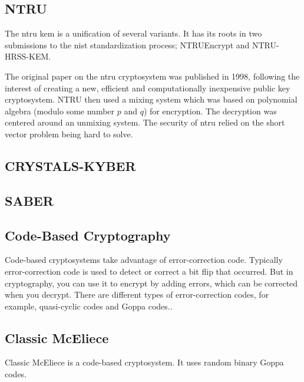 \subsection{NTRU}


The \gls{ntru} \gls{kem} is a unification of several variants. It has its roots in two submissions to the \gls{nist} standardization process; NTRUEncrypt and NTRU-HRSS-KEM.

The original paper on the \gls{ntru} cryptosystem was published in 1998, following the interest of creating a new, efficient and computationally inexpensive public key cryptosystem\cite{ntru1998}. NTRU then used a mixing system which was based on polynomial algebra (modulo some number $p$ and $q$) for encryption. The decryption was centered around an unmixing system. The security of \gls{ntru} relied on the short vector problem being hard to solve\cite{ntru1998}.


\subsection{CRYSTALS-KYBER}



\subsection{SABER}



\subsection{Code-Based Cryptography}
Code-based cryptosystems take advantage of error-correction code. Typically error-correction code is used to detect or correct a bit flip that occurred. But in cryptography, you can use it to encrypt by adding errors, which can be corrected when you decrypt\cite{bernstein2017}. There are different types of error-correction codes, for example, quasi-cyclic codes and Goppa codes.\cite{sendrier2011}.

\subsection{Classic McEliece}
Classic McEliece is a code-based cryptosystem. It uses random binary Goppa codes.


